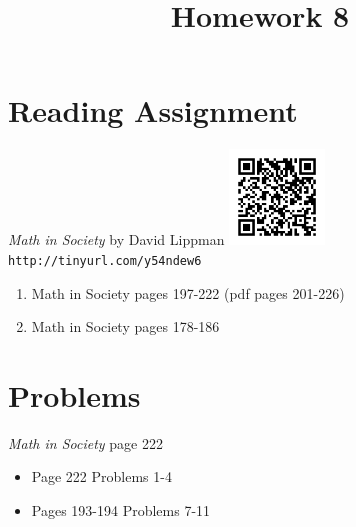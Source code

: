 \documentclass{article}
\title{Homework 8}
\date{}
\begin{document}
\maketitle

\section*{Reading Assignment}
\begin{center}
    {\em Math in Society} by David Lippman\newline
    \includegraphics[width=1in]{readings/society}\newline
    {\tt http://tinyurl.com/y54ndew6}
\end{center}
\begin{enumerate}
\item Math in Society pages 197-222 (pdf pages 201-226)
\item Math in Society pages 178-186
\end{enumerate}

\section{Problems}
{\em Math in Society} page 222
\begin{itemize}
	\item Page 222 Problems 1-4
    \item Pages 193-194 Problems 7-11
\end{itemize}
\end{document}
